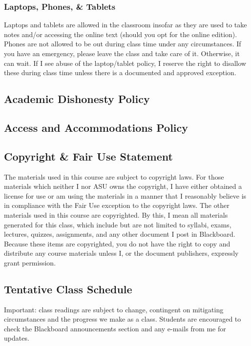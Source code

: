 \documentclass[11pt]{article}
\begin{document}
\subsubsection*{\textcolor{customred}{\bfseries Laptops, Phones, \& Tablets}}
Laptops and tablets are allowed in the classroom insofar as they are used to take notes and/or accessing the online text (should you opt for the online edition). Phones are not allowed to be out during class time under any circumstances. If you have an emergency, please leave the class and take care of it. Otherwise, it can wait. If I see abuse of the laptop/tablet policy, I reserve the right to disallow these during class time unless there is a documented and approved exception.

\subsection*{\textcolor{customred}{\bfseries Academic Dishonesty Policy}}

\subsection*{\textcolor{customred}{\bfseries Access and Accommodations Policy}}

\subsection*{\textcolor{customred}{\bfseries Copyright \& Fair Use Statement}}
The materials used in this course are subject to copyright laws. For those materials which neither I nor ASU owns the copyright, I have either obtained a license for use or am using the materials in a manner that I reasonably believe is in compliance with the Fair Use exception to the copyright laws. The other materials used in this course are copyrighted. By this, I mean all materials generated for this class, which include but are not limited to syllabi, exams, lectures, quizzes, assignments, and any other document I post in Blackboard. Because these items are copyrighted, you do not have the right to copy and distribute any course materials unless I, or the document publishers, expressly grant permission.
\clearpage
\subsection*{\textcolor{customred}{\bfseries Tentative Class Schedule}}
Important: class readings are subject to change, contingent on mitigating circumstances and the progress we make as a class. Students are encouraged to check the Blackboard announcements section and any e-mails from me for updates.\\
\end{document}
